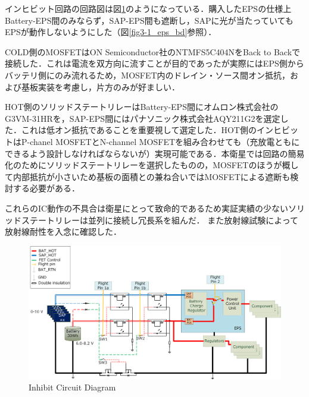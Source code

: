 インヒビット回路の回路図は図\ref{fig3_1_inhibit_d}のようになっている．購入したEPSの仕様上Battery-EPS間のみならず，SAP-EPS間も遮断し，SAPに光が当たっていてもEPSが動作しないようにした（図\ref{fig3-1_eps_bd}参照）．

COLD側のMOSFETはON Semiconductor社のNTMFS5C404NをBack to Backで接続した．これは電流を双方向に流すことが目的であったが実際にはEPS側からバッテリ側にのみ流れるため，MOSFET内のドレイン・ソース間オン抵抗，および基板実装を考慮し，片方のみが好ましい．

HOT側のソリッドステートリレーはBattery-EPS間にオムロン株式会社のG3VM-31HRを，SAP-EPS間にはパナソニック株式会社AQY211G2を選定した．これは低オン抵抗であることを重要視して選定した．HOT側のインヒビットはP-chanel MOSFETとN-channel MOSFETを組み合わせても（充放電ともにできるよう設計しなければならないが）実現可能である．本衛星では回路の簡易化のためにソリッドステートリレーを選択したものの，MOSFETのほうが概して内部抵抗が小さいため基板の面積との兼ね合いではMOSFETによる遮断も検討する必要がある．


これらのIC動作の不具合は衛星にとって致命的であるため実証実績の少ないソリッドステートリレーは並列に接続し冗長系を組んだ．
また放射線試験によって放射線耐性を入念に確認した．


\begin{figure}[htbp]
	\begin{center}
		\includegraphics[width=0.9\linewidth]{./03/fig/inhibit_diagram_2.png}
		\caption{Inhibit Circuit Diagram}
		\label{fig3_1_inhibit_d}
	\end{center}
\end{figure}





